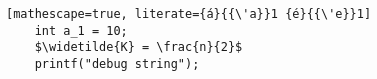 \documentclass{article}
\begin{document}
\begin{lstlisting}[mathescape=true, literate={á}{{\'a}}1 {é}{{\'e}}1]
    int a_1 = 10;
    $\widetilde{K} = \frac{n}{2}$
    printf("debug string");
\end{lstlisting}


\end{document}
